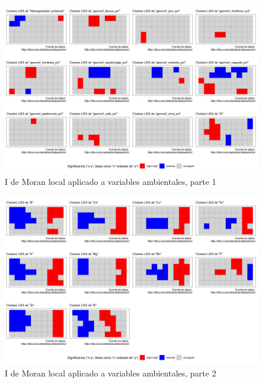 \documentclass[11pt,]{article}
\begin{document}
\begin{figure}
\centering
\includegraphics{ee_files/yodemoranlocal-1.png}
\caption{I de Moran local aplicado a variables ambientales, parte 1
\label{fig:imoranlocal1}}
\end{figure}

\begin{figure}
\centering
\includegraphics{ee_files/yodemoranlocal-2.png}
\caption{I de Moran local aplicado a variables ambientales, parte 2
\label{fig:imoranlocal2}}
\end{figure}
\end{document}
